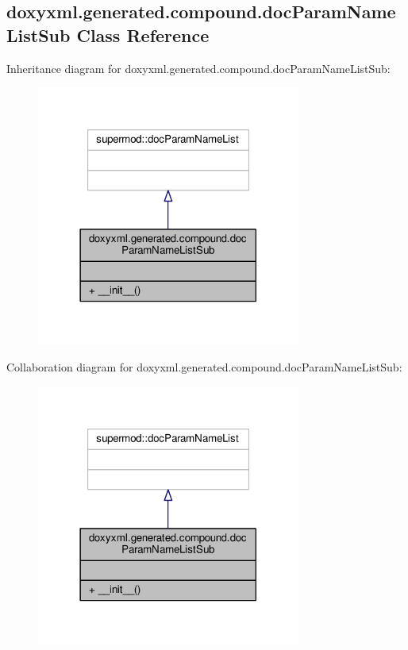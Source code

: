 \subsection{doxyxml.\+generated.\+compound.\+doc\+Param\+Name\+List\+Sub Class Reference}
\label{classdoxyxml_1_1generated_1_1compound_1_1docParamNameListSub}


Inheritance diagram for doxyxml.\+generated.\+compound.\+doc\+Param\+Name\+List\+Sub\+:
\nopagebreak
\begin{figure}[H]
\begin{center}
\leavevmode
\includegraphics[width=246pt]{da/d98/classdoxyxml_1_1generated_1_1compound_1_1docParamNameListSub__inherit__graph}
\end{center}
\end{figure}


Collaboration diagram for doxyxml.\+generated.\+compound.\+doc\+Param\+Name\+List\+Sub\+:
\nopagebreak
\begin{figure}[H]
\begin{center}
\leavevmode
\includegraphics[width=246pt]{d5/d5e/classdoxyxml_1_1generated_1_1compound_1_1docParamNameListSub__coll__graph}
\end{center}
\end{figure}
